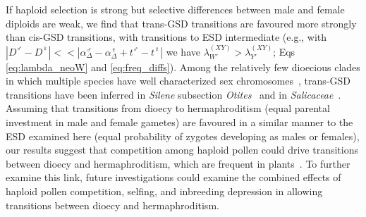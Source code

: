 \documentclass[10pt,letterpaper]{article}
\begin{document}
If haploid selection is strong but selective differences between male and female diploids are weak, we find that trans-GSD transitions are favoured more strongly than cis-GSD transitions, with transitions to ESD intermediate (e.g., with $|D^\male - D^\female| << |\alpha_\Delta^\male - \alpha_\Delta^\female + t^\male - t^\female|$ we have $\lambda_{W'}^{(XY)} > \lambda_{Y'}^{(XY)}$; Eqs \ref{eq:lambda_neoW} and \ref{eq:freq_diffs}). 
Among the relatively few dioecious clades in which multiple species have well characterized sex chromosomes~\cite{Ming:2011iy}, trans-GSD transitions have been inferred in \textit{Silene} subsection \textit{Otites}~\cite{Slancarova:2013dq} and in \textit{Salicaceae}~\cite{Pucholt2015,Pucholt2017}.
Assuming that transitions from dioecy to hermaphroditism (equal parental investment in male and female gametes) are favoured in a similar manner to the ESD examined here (equal probability of zygotes developing as males or females), our results suggest that competition among haploid pollen could drive transitions between dioecy and hermaphroditism, which are frequent in plants~\cite{Kafer2017, Goldberg2017}. 
To further examine this link, future investigations could examine the combined effects of haploid pollen competition, selfing, and inbreeding depression in allowing transitions between dioecy and hermaphroditism. 
\end{document}
